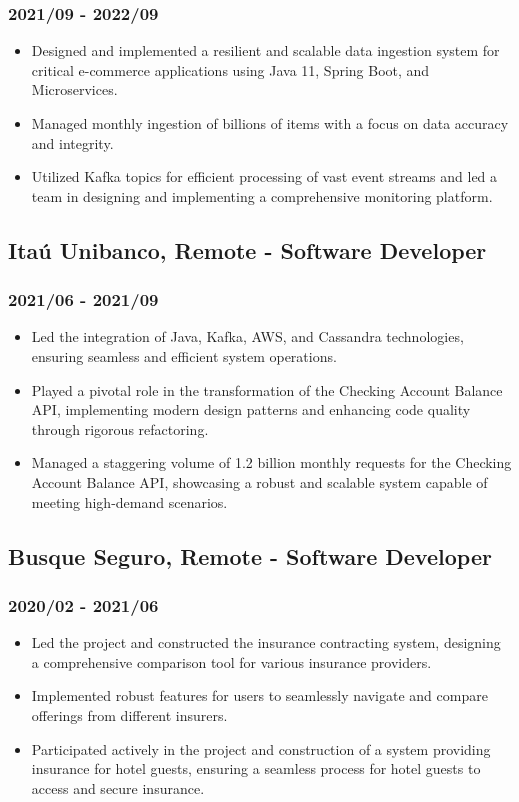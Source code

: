 \documentclass[a4paper,10pt]{article}
\begin{document}
\subsubsection*{2021/09 - 2022/09}
\begin{itemize}
    \item Designed and implemented a resilient and scalable data ingestion system for critical e-commerce applications using Java 11, Spring Boot, and Microservices.
    \item Managed monthly ingestion of billions of items with a focus on data accuracy and integrity.
    \item Utilized Kafka topics for efficient processing of vast event streams and led a team in designing and implementing a comprehensive monitoring platform.
\end{itemize}

\subsection*{Itaú Unibanco, Remote - Software Developer}
\subsubsection*{2021/06 - 2021/09}
\begin{itemize}
    \item Led the integration of Java, Kafka, AWS, and Cassandra technologies, ensuring seamless and efficient system operations.
    \item Played a pivotal role in the transformation of the Checking Account Balance API, implementing modern design patterns and enhancing code quality through rigorous refactoring.
    \item Managed a staggering volume of 1.2 billion monthly requests for the Checking Account Balance API, showcasing a robust and scalable system capable of meeting high-demand scenarios.
\end{itemize}

\subsection*{Busque Seguro, Remote - Software Developer}
\subsubsection*{2020/02 - 2021/06}
\begin{itemize}
    \item Led the project and constructed the insurance contracting system, designing a comprehensive comparison tool for various insurance providers.
    \item Implemented robust features for users to seamlessly navigate and compare offerings from different insurers.
    \item Participated actively in the project and construction of a system providing insurance for hotel guests, ensuring a seamless process for hotel guests to access and secure insurance.
\end{itemize}
\end{document}
